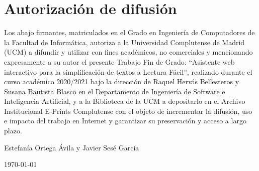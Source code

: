 \chapter*{Autorización de difusión}

   
Los abajo firmantes, matriculados en el Grado en Ingeniería de Computadores de la Facultad de Informática, autoriza a la Universidad Complutense de Madrid (UCM) a difundir y utilizar con fines académicos, no comerciales y mencionando expresamente a su autor el presente Trabajo Fin de Grado: ``Asistente web interactivo para la simplificación de textos a Lectura Fácil'', realizado durante el curso académico 2020/2021 bajo la dirección de Raquel Hervás Bellesteros y Susana Bautista Blasco en el Departamento de Ingeniería de Software e Inteligencia Artificial, y a la Biblioteca de la UCM a depositarlo en el Archivo Institucional E-Prints Complutense con el objeto de incrementar la difusión, uso e impacto del trabajo en Internet y garantizar su preservación y acceso a largo plazo.

\vspace{5cm}

\begin{center}
	\large Estefanía Ortega Ávila y Javier Sesé García\\
	
	\vspace{0.5cm}
	
	
	\today\\
	
\end{center}
